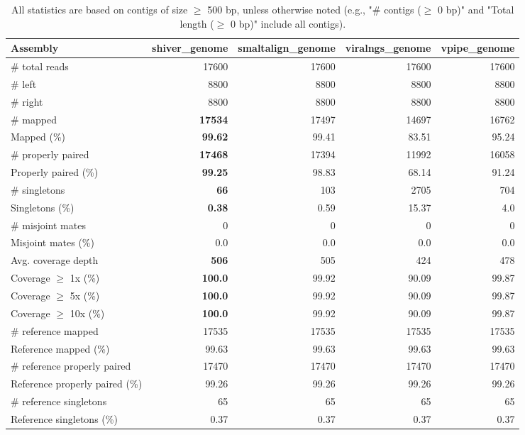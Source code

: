 \documentclass[12pt,a4paper]{article}
\begin{document}
\begin{table}[ht]
\begin{center}
\caption{All statistics are based on contigs of size $\geq$ 500 bp, unless otherwise noted (e.g., "\# contigs ($\geq$ 0 bp)" and "Total length ($\geq$ 0 bp)" include all contigs).}
\begin{tabular}{|l*{4}{|r}|}
\hline
Assembly & shiver\_genome & smaltalign\_genome & viralngs\_genome & vpipe\_genome \\ \hline
\# total reads & 17600 & 17600 & 17600 & 17600 \\ \hline
\# left & 8800 & 8800 & 8800 & 8800 \\ \hline
\# right & 8800 & 8800 & 8800 & 8800 \\ \hline
\# mapped & {\bf 17534} & 17497 & 14697 & 16762 \\ \hline
Mapped (\%) & {\bf 99.62} & 99.41 & 83.51 & 95.24 \\ \hline
\# properly paired & {\bf 17468} & 17394 & 11992 & 16058 \\ \hline
Properly paired (\%) & {\bf 99.25} & 98.83 & 68.14 & 91.24 \\ \hline
\# singletons & {\bf 66} & 103 & 2705 & 704 \\ \hline
Singletons (\%) & {\bf 0.38} & 0.59 & 15.37 & 4.0 \\ \hline
\# misjoint mates & 0 & 0 & 0 & 0 \\ \hline
Misjoint mates (\%) & 0.0 & 0.0 & 0.0 & 0.0 \\ \hline
Avg. coverage depth & {\bf 506} & 505 & 424 & 478 \\ \hline
Coverage $\geq$ 1x (\%) & {\bf 100.0} & 99.92 & 90.09 & 99.87 \\ \hline
Coverage $\geq$ 5x (\%) & {\bf 100.0} & 99.92 & 90.09 & 99.87 \\ \hline
Coverage $\geq$ 10x (\%) & {\bf 100.0} & 99.92 & 90.09 & 99.87 \\ \hline
\# reference mapped & 17535 & 17535 & 17535 & 17535 \\ \hline
Reference mapped (\%) & 99.63 & 99.63 & 99.63 & 99.63 \\ \hline
\# reference properly paired & 17470 & 17470 & 17470 & 17470 \\ \hline
Reference properly paired (\%) & 99.26 & 99.26 & 99.26 & 99.26 \\ \hline
\# reference singletons & 65 & 65 & 65 & 65 \\ \hline
Reference singletons (\%) & 0.37 & 0.37 & 0.37 & 0.37 \\ \hline

\end{tabular}
\end{center}
\end{table}
\end{document}
